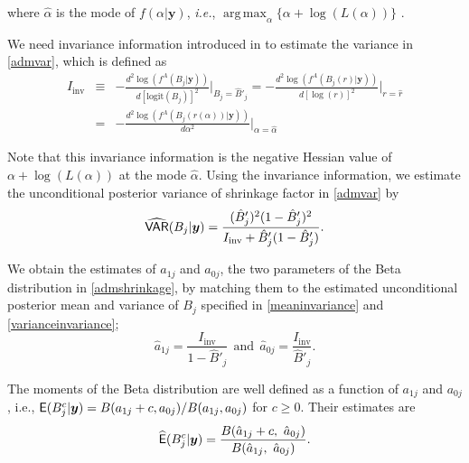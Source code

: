 \documentclass[article]{jss}
\DeclareMathOperator*{\argmax}{arg\,max}
\begin{document}

where $\hat{\alpha}$ is the mode of $f(\alpha\vert\boldsymbol{y})$, \emph{i.e.}, $\argmax_{\alpha}\{\alpha+\log(L(\alpha))\}$ .

We need  invariance information introduced in \cite{tang2011} to estimate the variance in  \eqref{admvar}, which is defined as 
\begin{eqnarray}
I_\textrm{inv} &\equiv& -\frac{d^2 \log(f^A(B_j\vert \boldsymbol{y}))}{d[\textrm{logit}(B_j)]^2}\bigg\vert_{B_j=\hat{B}'_j}=-\frac{d^2 \log(f^A(B_j(r)\vert \boldsymbol{y}))}{d[\log(r)]^2}\bigg\vert_{r=\hat{r}}\label{invariance}\\
&=& -\frac{d^2 \log(f^A(B_j(r(\alpha))\vert \boldsymbol{y}))}{d\alpha^2}\bigg\vert_{\alpha=\hat{\alpha}}\nonumber
\end{eqnarray}

Note that this invariance information is  the negative Hessian value of $\alpha+\log(L(\alpha))$ at the mode $\hat{\alpha}$. Using the invariance information, we  estimate the unconditional posterior variance of shrinkage factor in  \eqref{admvar} by
\begin{equation}\label{varianceinvariance}
\widehat{\mathsf{VAR}}(B_j\vert\boldsymbol{y})=\frac{(\hat{B}'_j)^2(1-\hat{B}'_j)^2}{I_\textrm{inv} +\hat{B}'_j(1-\hat{B}'_j)}.
\end{equation}

We obtain the estimates of $a_{1j}$ and $a_{0j}$, the two parameters of the Beta distribution in  \eqref{admshrinkage}, by matching them to the estimated unconditional posterior mean and variance of $B_j$ specified in  \eqref{meaninvariance} and \eqref{varianceinvariance};
\begin{equation}\label{admpara}
\hat{a}_{1j}=\frac{I_\textrm{inv}}{1-\hat{B}'_j}~~\textrm{and}~~\hat{a}_{0j}=\frac{I_\textrm{inv}}{\hat{B}'_j}.
\end{equation}

The moments of the Beta distribution are well defined as a function of $a_{1j}$ and $a_{0j}$, i.e.,  $\mathsf{E}(B^c_j\vert\boldsymbol{y})=B(a_{1j} + c, a_{0j})/B(a_{1j}, a_{0j})$ for $c\ge0$. Their estimates are 
\begin{equation}\label{shrinkagemoments}
\widehat{\mathsf{E}}(B^c_j\vert\boldsymbol{y})= \frac{B(\hat{a}_{1j} + c,~ \hat{a}_{0j})}{B(\hat{a}_{1j},~ \hat{a}_{0j})}.
\end{equation}
\end{document}
